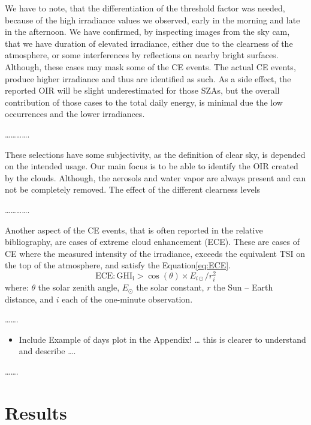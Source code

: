 \documentclass[preprint, 3p,
authoryear]{elsarticle} %
\providecommand{\tightlist}{%
  \setlength{\itemsep}{0pt}\setlength{\parskip}{0pt}}
\begin{document}
We have to note, that the differentiation of the threshold factor was
needed, because of the high irradiance values we observed, early in the
morning and late in the afternoon. We have confirmed, by inspecting
images from the sky cam, that we have duration of elevated irradiance,
either due to the clearness of the atmosphere, or some interferences by
reflections on nearby bright surfaces. Although, these cases may mask
some of the CE events. The actual CE events, produce higher irradiance
and thus are identified as such. As a side effect, the reported OIR will
be slight underestimated for those SZAs, but the overall contribution of
those cases to the total daily energy, is minimal due the low
occurrences and the lower irradiances.

\ldots\ldots\ldots\ldots.

These selections have some subjectivity, as the definition of clear sky,
is depended on the intended usage. Our main focus is to be able to
identify the OIR created by the clouds. Although, the aerosols and water
vapor are always present and can not be completely removed. The effect
of the different clearness levels

\ldots\ldots\ldots\ldots.

Another aspect of the CE events, that is often reported in the relative
bibliography, are cases of extreme cloud enhancement (ECE). These are
cases of CE where the measured intensity of the irradiance, exceeds the
equivalent TSI on the top of the atmosphere, and satisfy the
Equation\nobreakspace{}\ref{eq:ECE}. \begin{equation}
\text{ECE}: \text{GHI}_\text{i} > \cos(\theta) \times E_{i\odot} / r_{i}^2
\label{eq:ECE}
\end{equation} where: \(\theta\) the solar zenith angle, \(E_{\odot}\)
the solar constant, \(r\) the Sun -- Earth distance, and \(i\) each of
the one-minute observation.

\ldots\ldots.

\begin{itemize}
\tightlist
\item
  Include Example of days plot in the Appendix! \ldots{} this is clearer
  to understand and describe \ldots.
\end{itemize}

\ldots\ldots.

\hypertarget{results}{%
\section{Results}\label{results}}
\end{document}
